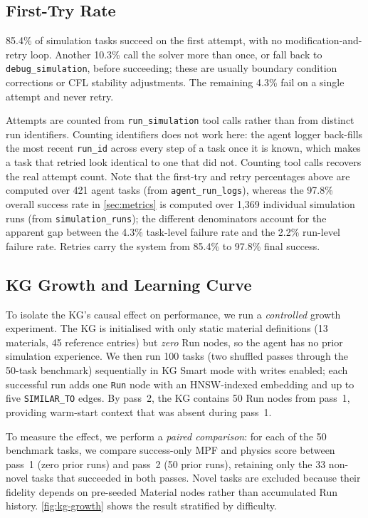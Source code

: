 \documentclass[preprint,review,12pt]{elsarticle}
\newif\ifrevisionsvisible
\newcommand{\revised}[1]{%
  \ifrevisionsvisible\textcolor{revisionred}{#1}\else#1\fi}
\begin{document}
\subsection{First-Try Rate}

\revised{85.4\% of simulation tasks succeed on the first attempt, with no
modification-and-retry loop.  Another 10.3\% call the solver more than
once, or fall back to \texttt{debug\_simulation}, before succeeding;
these are usually boundary condition corrections or CFL stability
adjustments.  The remaining 4.3\% fail on a single attempt and never
retry.}

\revised{Attempts are counted from \texttt{run\_simulation} tool calls rather
than from distinct run identifiers.  Counting identifiers does not work
here: the agent logger back-fills the most recent \texttt{run\_id} across
every step of a task once it is known, which makes a task that retried
look identical to one that did not.  Counting tool calls recovers the
real attempt count.  Note that the first-try and retry percentages above
are computed over 421 agent tasks (from \texttt{agent\_run\_logs}),
whereas the 97.8\% overall success rate in \cref{sec:metrics} is
computed over 1{,}369 individual simulation runs (from
\texttt{simulation\_runs}); the different denominators account for the
apparent gap between the 4.3\% task-level failure rate and the 2.2\%
run-level failure rate.  Retries carry the
system from 85.4\% to 97.8\% final success.}

\subsection{KG Growth and Learning Curve}
\label{sec:kg-growth}

To isolate the KG's causal effect on performance, we run a
\emph{controlled} growth experiment.  The KG is initialised with only
static material definitions (13 materials, 45 reference entries) but
\emph{zero} Run nodes, so the agent has no prior simulation experience.
We then run 100 tasks (two shuffled passes through the 50-task
benchmark) sequentially in KG Smart mode with writes enabled; each
successful run adds one \texttt{Run} node with an HNSW-indexed
embedding and up to five \texttt{SIMILAR\_TO} edges.  By pass~2, the
KG contains 50 Run nodes from pass~1, providing warm-start context
that was absent during pass~1.

To measure the effect, we perform a \emph{paired comparison}: for
each of the 50 benchmark tasks, we compare success-only MPF and
physics score between pass~1 (zero prior runs) and pass~2 (50 prior
runs), retaining only the 33 non-novel tasks that succeeded in both
passes.  Novel tasks are excluded because their fidelity depends on
pre-seeded Material nodes rather than accumulated Run history.
\cref{fig:kg-growth} shows the result stratified by difficulty.
\end{document}
